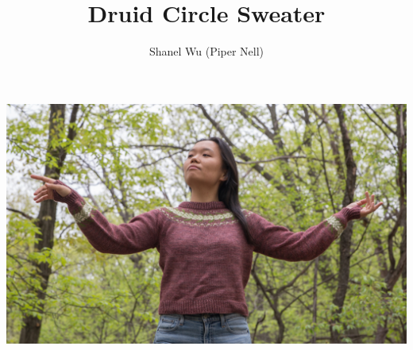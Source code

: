 \documentclass[12pt]{article}
\title{Druid Circle Sweater} %
\author{Shanel Wu (Piper Nell)}
\begin{document}

\begin{center}
\includegraphics[width=7in]{pointing.jpg}
\end{center}


{\selectfont
\HUGE\textbf{\thetitle}
\hspace{0.5em} %
\normalsize\theauthor
}
\end{document}
